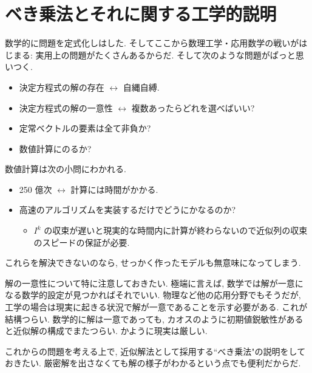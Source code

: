 \documentclass[openany, a4paper, oneside]{jsbook}
\begin{document}
\section{ベき乗法とそれに関する工学的説明}

数学的に問題を定式化しはした.
そしてここから数理工学・応用数学の戦いがはじまる:
実用上の問題がたくさんあるからだ.
そして次のような問題がぱっと思いつく.
\begin{itemize}
\item 決定方程式の解の存在 $\leftrightarrow$ 自縄自縛.
\item 決定方程式の解の一意性 $\leftrightarrow$ 複数あったらどれを選べばいい?
\item 定常ベクトルの要素は全て非負か?
\item 数値計算にのるか?
\end{itemize}
数値計算は次の小問にわかれる.
\begin{itemize}
\item 250 億次 $\leftrightarrow$ 計算には時間がかかる.
\item 高速のアルゴリズムを実装するだけでどうにかなるのか?
\begin{itemize}
\item $I^k$ の収束が遅いと現実的な時間内に計算が終わらないので近似列の収束のスピードの保証が必要.
\end{itemize}
\end{itemize}
これらを解決できないのなら, せっかく作ったモデルも無意味になってしまう.
\begin{rem}[解の一意性]
解の一意性について特に注意しておきたい.
極端に言えば, 数学では解が一意になる数学的設定が見つかればそれでいい.
物理など他の応用分野でもそうだが, 工学の場合は現実に起きる状況で解が一意であることを示す必要がある.
これが結構つらい.
数学的に解は一意であっても, カオスのように初期値鋭敏性があると近似解の構成でまたつらい.
かように現実は厳しい.
\end{rem}

これからの問題を考える上で, 近似解法として採用する``べき乗法"の説明をしておきたい.
厳密解を出さなくても解の様子がわかるという点でも便利だからだ.
\end{document}
